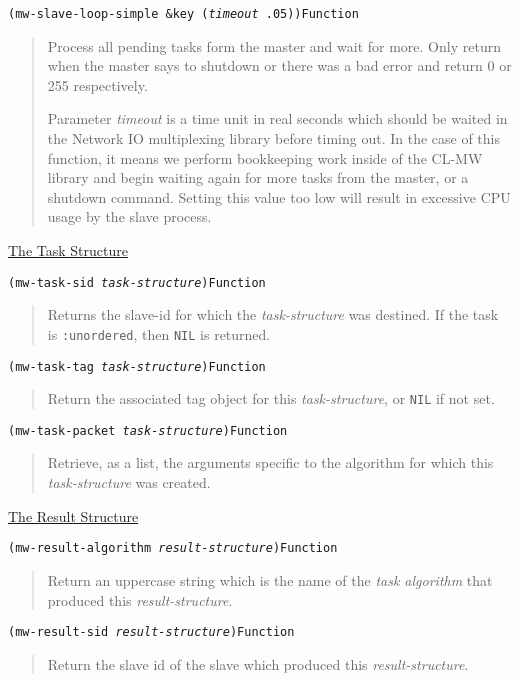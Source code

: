 \documentclass[titlepage,12pt]{book}
\newcommand{\xsmall}{\latexhtml{\small}{}}
\newcommand{\xnormalsize}{\latexhtml{\normalsize}{}}
\newcommand{\clmw}{\xsmall\textsc{CL-MW}\xnormalsize\xspace}
\newcommand{\ta}{\textit{task algorithm}\xspace}
\newcommand{\un}{\texttt{:unordered}\xspace}
\newcommand{\bool}[1]{\texttt{#1}\xspace}
\newcommand{\apiheader}[1]{\begin{center}\underline{#1}\end{center}}
\newcommand{\apifunc}[2]{\noindent\xsmall\texttt{(#1)}\hspace*{\fill}\xnormalsize\texttt{#2}}
\newenvironment{apientry}[2]
	{\apifunc{#1}{#2}\begin{quotation}}
	{\end{quotation}}
\begin{document}
\begin{apientry}
{mw-slave-loop-simple \&key (\emph{timeout} .05)}
{Function}
Process all pending tasks form the master and wait for more. Only
return when the master says to shutdown or there was a bad error and
return 0 or 255 respectively.

Parameter \emph{timeout} is a time unit in real seconds which should
be waited in the Network IO multiplexing library before timing out.
In the case of this function, it means we perform bookkeeping work
inside of the \clmw library and begin waiting again for more tasks
from the master, or a shutdown command. Setting this value too low
will result in excessive CPU usage by the slave process.
\end{apientry}

\apiheader{The Task Structure}
\begin{apientry}
{mw-task-sid \emph{task-structure}}
{Function}
Returns the slave-id for which the \emph{task-structure} was destined. 
If the task is \un, then \bool{NIL} is returned.
\end{apientry}

\begin{apientry}
{mw-task-tag \emph{task-structure}}
{Function}
Return the associated tag object for this \emph{task-structure}, or \bool{NIL}
if not set.
\end{apientry}

\begin{apientry}
{mw-task-packet \emph{task-structure}}
{Function}
Retrieve, as a list, the arguments specific to the algorithm for
which this \emph{task-structure} was created.
\end{apientry}

\apiheader{The Result Structure}
\begin{apientry}
{mw-result-algorithm \emph{result-structure}}
{Function}
Return an uppercase string which is the name of the \ta that produced this
\emph{result-structure}.
\end{apientry}

\begin{apientry}
{mw-result-sid \emph{result-structure}}
{Function}
Return the slave id of the slave which produced this \emph{result-structure}.
\end{apientry}
\end{document}
